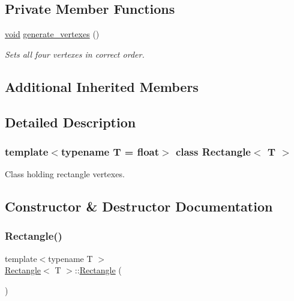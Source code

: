 \subsection*{Private Member Functions}
\begin{DoxyCompactItemize}
\item 
\mbox{\hyperlink{glad_8h_a950fc91edb4504f62f1c577bf4727c29}{void}} \mbox{\hyperlink{classRectangle_a0f9d67fb9478883f067c47cdc7bf7bca}{generate\+\_\+vertexes}} ()
\begin{DoxyCompactList}\small\item\em Sets all four vertexes in correct order. \end{DoxyCompactList}\end{DoxyCompactItemize}
\subsection*{Additional Inherited Members}


\subsection{Detailed Description}
\subsubsection*{template$<$typename T = float$>$\newline
class Rectangle$<$ T $>$}

Class holding rectangle vertexes. 

\subsection{Constructor \& Destructor Documentation}
\mbox{\label{classRectangle_a9d9da3fc8bcb125516cbf2d711d325eb}} 
\subsubsection{\texorpdfstring{Rectangle()}{Rectangle()}\hspace{0.1cm}{\footnotesize\ttfamily [1/3]}}
{\footnotesize\ttfamily template$<$typename T $>$ \\
\mbox{\hyperlink{classRectangle}{Rectangle}}$<$ T $>$\+::\mbox{\hyperlink{classRectangle}{Rectangle}} (\begin{DoxyParamCaption}{ }\end{DoxyParamCaption})}



